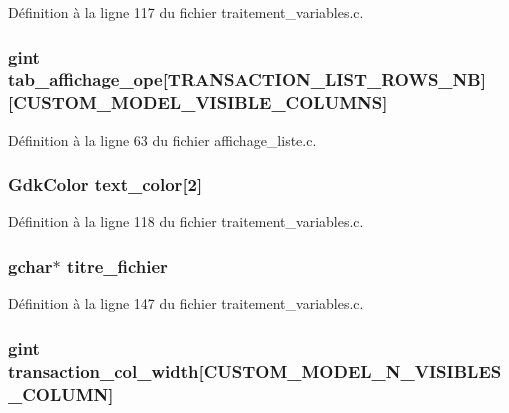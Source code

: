 Définition à la ligne 117 du fichier traitement\_\-variables.c.

\subsubsection[{tab\_\-affichage\_\-ope}]{\setlength{\rightskip}{0pt plus 5cm}gint {\bf tab\_\-affichage\_\-ope}[TRANSACTION\_\-LIST\_\-ROWS\_\-NB][CUSTOM\_\-MODEL\_\-VISIBLE\_\-COLUMNS]}\label{gsb__file__load_8c_a0c444565adac369ff42631d4b7b7e6bb}


Définition à la ligne 63 du fichier affichage\_\-liste.c.

\subsubsection[{text\_\-color}]{\setlength{\rightskip}{0pt plus 5cm}GdkColor {\bf text\_\-color}[2]}\label{gsb__file__load_8c_a8169600c05eb3674c1b11ca67dd677d3}


Définition à la ligne 118 du fichier traitement\_\-variables.c.

\subsubsection[{titre\_\-fichier}]{\setlength{\rightskip}{0pt plus 5cm}gchar$\ast$ {\bf titre\_\-fichier}}\label{gsb__file__load_8c_a787cc81cf2ad728775b73d723713980b}


Définition à la ligne 147 du fichier traitement\_\-variables.c.

\subsubsection[{transaction\_\-col\_\-width}]{\setlength{\rightskip}{0pt plus 5cm}gint {\bf transaction\_\-col\_\-width}[CUSTOM\_\-MODEL\_\-N\_\-VISIBLES\_\-COLUMN]}\label{gsb__file__load_8c_a6e5e85a5f63608656ce9709950bb08e6}



